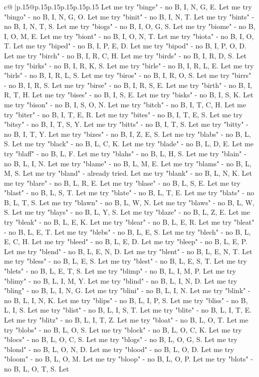 \documentclass{article}
\begin{document}
{\begin{supertabular}{c@{$\;$}|p{.15\linewidth}@{}p{.15\linewidth}p{.15\linewidth}p{.15\linewidth}p{.15\linewidth}p{.15\linewidth}}
{{{Let me try "binge" {-} no B, I, N, G, E. Let me try "bingo" {-} no B, I, N, G, O. Let me try "binit" {-} no B, I, N, T. Let me try "bints" {-} no B, I, N, T, S. Let me try "biogs" {-} no B, I, O, G, S. Let me try "biome" {-} no B, I, O, M, E. Let me try "biont" {-} no B, I, O, N, T. Let me try "biota" {-} no B, I, O, T. Let me try "biped" {-} no B, I, P, E, D. Let me try "bipod" {-} no B, I, P, O, D. Let me try "birch" {-} no B, I, R, C, H. Let me try "birds" {-} no B, I, R, D, S. Let me try "birks" {-} no B, I, R, K, S. Let me try "birle" {-} no B, I, R, L, E. Let me try "birls" {-} no B, I, R, L, S. Let me try "biros" {-} no B, I, R, O, S. Let me try "birrs" {-} no B, I, R, S. Let me try "birse" {-} no B, I, R, S, E. Let me try "birth" {-} no B, I, R, T, H. Let me try "bises" {-} no B, I, S, E. Let me try "bisks" {-} no B, I, S, K. Let me try "bison" {-} no B, I, S, O, N. Let me try "bitch" {-} no B, I, T, C, H. Let me try "biter" {-} no B, I, T, E, R. Let me try "bites" {-} no B, I, T, E, S. Let me try "bitsy" {-} no B, I, T, S, Y. Let me try "bitts" {-} no B, I, T, S. Let me try "bitty" {-} no B, I, T, Y. Let me try "bizes" {-} no B, I, Z, E, S. Let me try "blabs" {-} no B, L, S. Let me try "black" {-} no B, L, C, K. Let me try "blade" {-} no B, L, D, E. Let me try "blaff" {-} no B, L, F. Let me try "blahs" {-} no B, L, H, S. Let me try "blain" {-} no B, L, I, N. Let me try "blame" {-} no B, L, M, E. Let me try "blams" {-} no B, L, M, S. Let me try "bland" {-} already tried. Let me try "blank" {-} no B, L, N, K. Let me try "blare" {-} no B, L, R, E. Let me try "blase" {-} no B, L, S, E. Let me try "blast" {-} no B, L, S, T. Let me try "blate" {-} no B, L, T, E. Let me try "blats" {-} no B, L, T, S. Let me try "blawn" {-} no B, L, W, N. Let me try "blaws" {-} no B, L, W, S. Let me try "blays" {-} no B, L, Y, S. Let me try "blaze" {-} no B, L, Z, E. Let me try "bleak" {-} no B, L, E, K. Let me try "blear" {-} no B, L, E, R. Let me try "bleat" {-} no B, L, E, T. Let me try "blebs" {-} no B, L, E, S. Let me try "blech" {-} no B, L, E, C, H. Let me try "bleed" {-} no B, L, E, D. Let me try "bleep" {-} no B, L, E, P. Let me try "blend" {-} no B, L, E, N, D. Let me try "blent" {-} no B, L, E, N, T. Let me try "bless" {-} no B, L, E, S. Let me try "blest" {-} no B, L, E, S, T. Let me try "blets" {-} no B, L, E, T, S. Let me try "blimp" {-} no B, L, I, M, P. Let me try "blimy" {-} no B, L, I, M, Y. Let me try "blind" {-} no B, L, I, N, D. Let me try "bling" {-} no B, L, I, N, G. Let me try "blini" {-} no B, L, I, N. Let me try "blink" {-} no B, L, I, N, K. Let me try "blips" {-} no B, L, I, P, S. Let me try "bliss" {-} no B, L, I, S. Let me try "blist" {-} no B, L, I, S, T. Let me try "blite" {-} no B, L, I, T, E. Let me try "blitz" {-} no B, L, I, T, Z. Let me try "bloat" {-} no B, L, O, T. Let me try "blobs" {-} no B, L, O, S. Let me try "block" {-} no B, L, O, C, K. Let me try "blocs" {-} no B, L, O, C, S. Let me try "blogs" {-} no B, L, O, G, S. Let me try "blond" {-} no B, L, O, N, D. Let me try "blood" {-} no B, L, O, D. Let me try "bloom" {-} no B, L, O, M. Let me try "bloop" {-} no B, L, O, P. Let me try "blots" {-} no B, L, O, T, S. Let }}}
\end{supertabular}}
\end{document}
